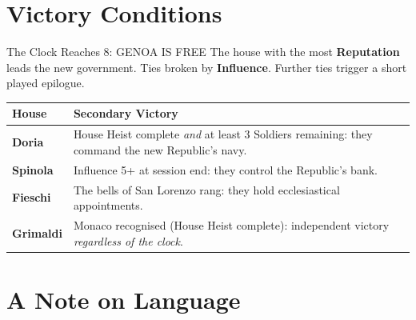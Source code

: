 \section{Victory Conditions}
\label{sec:victory}

\begin{rulebox}[GoldRPG]{The Clock Reaches 8: GENOA IS FREE}
The house with the most \textbf{Reputation} leads the new government.
Ties broken by \textbf{Influence}. Further ties trigger a short
played epilogue.
\end{rulebox}

\medskip

\begin{center}
\begin{tabular}{L{2.5cm} p{11cm}}
  \toprule
  \textbf{House} & \textbf{Secondary Victory} \\
  \midrule
  \textbf{Doria}   & House Heist complete \textit{and} at least 3 Soldiers remaining:
                     they command the new Republic's navy. \\
  \textbf{Spinola} & Influence 5+ at session end: they control the Republic's bank. \\
  \textbf{Fieschi} & The bells of San Lorenzo rang: they hold ecclesiastical appointments. \\
  \textbf{Grimaldi}& Monaco recognised (House Heist complete): independent victory
                     \textit{regardless of the clock}. \\
  \bottomrule
\end{tabular}
\end{center}

\section{A Note on Language}
\label{sec:language}

